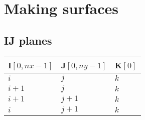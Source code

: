 \documentclass{article}
\begin{document}
\section{Making surfaces}

\subsection{IJ planes}

\begin{center}
\begin{tabular}{lll}
I$[0,nx-1]$ & J$[0,ny-1]$ & K$[0]$\\
	  \midrule
	  $i$ & $j$ & $k$\\
	      $i+1$ & $j$ & $k$\\
	      $i+1$ & $j+1$ & $k$\\
	      $i$ & $j+1$ & $k$
	      \end{tabular}
	      \end{center}
\end{document}
